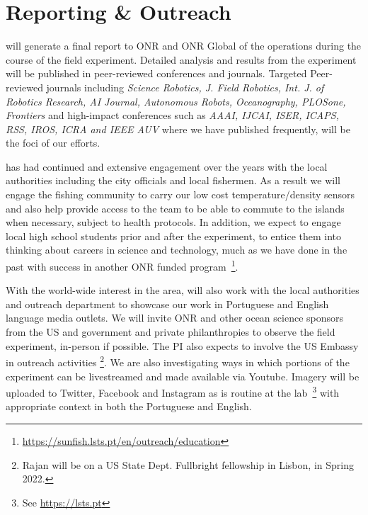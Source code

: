\section{Reporting \& Outreach}

\proj will generate a final report to ONR and ONR Global of the
operations during the course of the field experiment. Detailed
analysis and results from the experiment will be published in
peer-reviewed conferences and journals. Targeted Peer-reviewed
journals including \emph{Science Robotics, J. Field Robotics,
  Int. J. of Robotics Research, AI Journal, Autonomous Robots,
  Oceanography, PLOSone, Frontiers} and high-impact conferences such
as \emph{AAAI, IJCAI, ISER, ICAPS, RSS, IROS, ICRA and IEEE AUV} where
we have published frequently, will be the foci of our efforts.

\inst has had continued and extensive engagement over the years with the
local authorities including the \naz city officials and local fishermen.
As a result we will engage the fishing community to carry our low cost
temperature/density sensors and also help provide access to the team to
be able to commute to the islands when necessary, subject to health
protocols. In addition, we expect to engage local high school students
prior and after the experiment, to entice them into thinking about
careers in science and technology, much as we have done in the past with
success in another ONR funded
program~\footnote{\url{https://sunfish.lsts.pt/en/outreach/education}}.

With the world-wide interest in the \naz area, \proj will also work
with the local authorities and \univ outreach department to showcase
our work in Portuguese and English language media outlets. We will
invite ONR and other ocean science sponsors from the US and government
and private philanthropies to observe the field experiment, in-person
if possible. The PI also expects to involve the US Embassy in outreach
activities \footnote{Rajan will be on a US State Dept. Fullbright
  fellowship in Lisbon, in Spring 2022.}. We are also investigating
ways in which portions of the experiment can be livestreamed and made
available via Youtube. Imagery will be uploaded to Twitter, Facebook
and Instagram as is routine at the \ls lab~\footnote{See
  \url{https://lsts.pt}} with appropriate context in both the
Portuguese and English.


